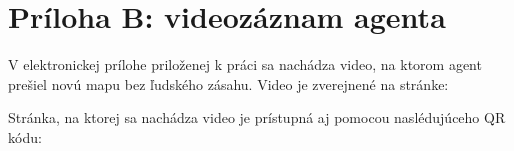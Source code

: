 \chapter*{Príloha B: videozáznam agenta }

V elektronickej prílohe priloženej k práci sa nachádza video, na ktorom agent prešiel
novú mapu bez ľudského zásahu. Video je zverejnené na stránke:

\url{}


Stránka, na ktorej sa nachádza video je prístupná aj pomocou naslédujúceho QR
kódu:

